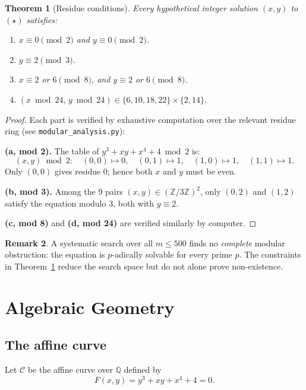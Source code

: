 \documentclass[12pt, a4paper]{article}
\newtheorem{theorem}{Theorem}[section]
\theoremstyle{definition}
\newtheorem{remark}[theorem]{Remark}
\newcommand{\Z}{\mathbb{Z}}
\newcommand{\Q}{\mathbb{Q}}
\begin{document}
\begin{theorem}[Residue conditions]\label{thm:mod}
  Every hypothetical integer solution $(x,y)$ to $(\star)$ satisfies:
  \begin{enumerate}[label=(\alph*)]
    \item $x\equiv 0\pmod{2}$ and $y\equiv 0\pmod{2}$.
    \item $y\equiv 2\pmod{3}$.
    \item $x\equiv 2$ or $6\pmod{8}$, and $y\equiv 2$ or $6\pmod{8}$.
    \item $(x\bmod 24,\,y\bmod 24)\in\{6,10,18,22\}\times\{2,14\}$.
  \end{enumerate}
\end{theorem}
\begin{proof}
  Each part is verified by exhaustive computation over the relevant residue ring
  (see \texttt{modular\_analysis.py}):

  \textbf{(a, mod 2).}  The table of $y^3+xy+x^4+4\bmod 2$ is:
  \[
    (x,y)\bmod 2:\quad (0,0)\mapsto 0,\quad(0,1)\mapsto 1,\quad(1,0)\mapsto 1,\quad(1,1)\mapsto 1.
  \]
  Only $(0,0)$ gives residue $0$; hence both $x$ and $y$ must be even.

  \textbf{(b, mod 3).}  Among the 9 pairs $(x,y)\in(\Z/3\Z)^2$, only $(0,2)$ and $(1,2)$ satisfy the equation modulo 3, both with $y\equiv 2$.

  \textbf{(c, mod 8)} and \textbf{(d, mod 24)} are verified similarly by computer.
\end{proof}

\begin{remark}
  A systematic search over all $m\leq 500$ finds no \emph{complete} modular obstruction:
  the equation is $p$-adically solvable for every prime $p$.
  The constraints in Theorem~\ref{thm:mod} reduce the search space but do not
  alone prove non-existence.
\end{remark}

\section{Algebraic Geometry}

\subsection{The affine curve}

Let $\mathcal{C}$ be the affine curve over $\Q$ defined by
\[
  F(x,y) = y^3 + xy + x^4 + 4 = 0.
\]
\end{document}
